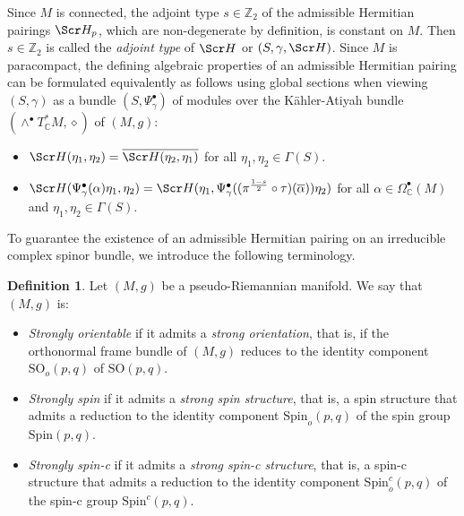\documentclass[10pt,a4paper,twoside,reqno]{amsart}
\theoremstyle{plain}
\theoremstyle{definition}
\newtheorem{definition}[thm]{Definition}
\theoremstyle{remark}
\def\Z{\mathbb{Z}}
\def\C{\mathbb{C}}
\def\scS{\Scr H}
\def\Spin{\mathrm{Spin}}
\def\Spin{\mathrm{Spin}}
\def\SO{\mathrm{SO}}
\begin{document}
Since $M$ is connected, the adjoint type $s\in\Z_2$ of the admissible Hermitian pairings $\scS_p$, which are non-degenerate by definition, is constant on $M$. Then $s\in\Z_2$ is called the \emph{adjoint type} of $\scS$ or $(S,\gamma,\scS)$. Since $M$ is paracompact, the defining algebraic properties of an admissible Hermitian pairing can be formulated equivalently as follows using global sections when viewing $(S,\gamma)$ as a bundle $(S,\Psi^{\bullet}_{\gamma})$ of modules over the Kähler-Atiyah bundle $(\wedge^{\bullet}T^*_\C M,\diamond)$ of $(M,g)$: 
\begin{itemize}
\item $\scS(\eta_1,\eta_2)=\overline{\scS(\eta_2,\eta_1)}$ for all $\eta_1,\eta_2\in\Gamma(S)$.
\item $\scS(\Psi^{\bullet}_\gamma(\alpha)\eta_1,\eta_2)=\scS(\eta_1,\Psi^{\bullet}_\gamma((\pi^{\frac{1-s}{2}}\circ\tau)(\overline{\alpha}))\eta_2)$ for all $\alpha\in\Omega^{\bullet}_{\mathbb{C}}(M)$ and $\eta_1,\eta_2\in\Gamma(S)$.
\end{itemize}

To guarantee the existence of an admissible Hermitian pairing on an irreducible complex spinor bundle, we introduce the following terminology.

\begin{definition}
Let $(M,g)$ be a pseudo-Riemannian manifold. We say that $(M,g)$ is: \begin{itemize}
\item \emph{Strongly orientable} if it admits a \emph{strong orientation}, that is, if the orthonormal frame bundle of $(M,g)$ reduces to the identity component $\SO_o(p,q)$ of $\SO(p,q)$.
\item \emph{Strongly spin} if it admits a \emph{strong spin structure}, that is, a spin structure that admits a reduction to the identity component $\Spin_o(p,q)$ of the spin group $\Spin(p,q)$.
\item \emph{Strongly spin-c} if it admits a \emph{strong spin-c structure}, that is, a spin-c structure that admits a reduction to the identity component $\Spin^c_o(p,q)$ of the spin-c group $\Spin^c(p,q)$.
\end{itemize}
\end{definition}
\end{document}

